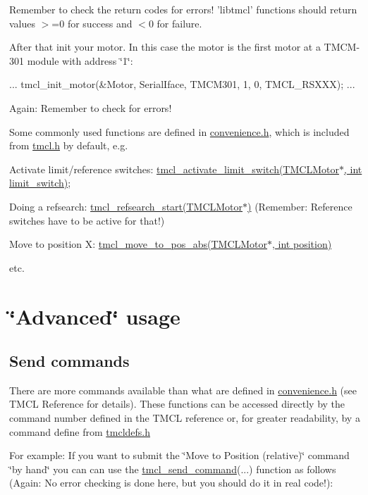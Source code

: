 Remember to check the return codes for errors! 'libtmcl' functions should return values $>$=0 for success and $<$0 for failure.

After that init your motor. In this case the motor is the first motor at a TMCM-\/301 module with address \char`\"{}1\char`\"{}:


\begin{DoxyCode}
 ...
 tmcl_init_motor(&Motor, SerialIface, TMCM301, 1, 0, TMCL_RSXXX);
 ...
\end{DoxyCode}


Again: Remember to check for errors!

Some commonly used functions are defined in \hyperlink{convenience_8h}{convenience.h}, which is included from \hyperlink{tmcl_8h}{tmcl.h} by default, e.g.


\begin{DoxyItemize}
\item Activate limit/reference switches: \hyperlink{convenience_8h_abfa4f22d0004e1c6a6edae3720cbcd11}{tmcl\_\-activate\_\-limit\_\-switch(TMCLMotor$\ast$, int limit\_\-switch)};
\item Doing a refsearch: \hyperlink{convenience_8h_a002fe6b01caeb3a1c4c245e15d96d5f0}{tmcl\_\-refsearch\_\-start(TMCLMotor$\ast$)} (Remember: Reference switches have to be active for that!)
\item Move to position X: \hyperlink{convenience_8h_ade9c1b3e4ada816b7bdd76d7fd2e1639}{tmcl\_\-move\_\-to\_\-pos\_\-abs(TMCLMotor$\ast$, int position)}
\item etc.
\end{DoxyItemize}\hypertarget{index_advanced}{}\section{\char`\"{}Advanced\char`\"{} usage}\label{index_advanced}
\hypertarget{index_sendcommand}{}\subsection{Send commands}\label{index_sendcommand}
There are more commands available than what are defined in \hyperlink{convenience_8h}{convenience.h} (see TMCL Reference for details). These functions can be accessed directly by the command number defined in the TMCL reference or, for greater readability, by a command define from \hyperlink{group__TMCLComm}{tmcldefs.h}

For example: If you want to submit the \char`\"{}Move to Position (relative)\char`\"{} command \char`\"{}by hand\char`\"{} you can can use the \hyperlink{motor_8h_a0994799e6eeee41f70093c081bdc7d0a}{tmcl\_\-send\_\-command}(...) function as follows (Again: No error checking is done here, but you should do it in real code!):



